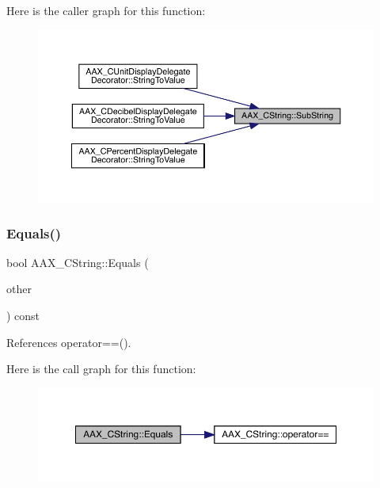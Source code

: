 Here is the caller graph for this function\+:
\nopagebreak
\begin{figure}[H]
\begin{center}
\leavevmode
\includegraphics[width=350pt]{a01573_a35132df5b9f73bc2ddbfd673f4a5d22a_icgraph}
\end{center}
\end{figure}
\mbox{\label{a01573_a842003a3cf6fb84be1f42160e87e0966}} 
\subsubsection{\texorpdfstring{Equals()}{Equals()}\hspace{0.1cm}{\footnotesize\ttfamily [1/3]}}
{\footnotesize\ttfamily bool A\+A\+X\+\_\+\+C\+String\+::\+Equals (\begin{DoxyParamCaption}\item[{const \mbox{\hyperlink{a01573}{A\+A\+X\+\_\+\+C\+String}} \&}]{other }\end{DoxyParamCaption}) const\hspace{0.3cm}{\ttfamily [inline]}}



References operator==().

Here is the call graph for this function\+:
\nopagebreak
\begin{figure}[H]
\begin{center}
\leavevmode
\includegraphics[width=350pt]{a01573_a842003a3cf6fb84be1f42160e87e0966_cgraph}
\end{center}
\end{figure}
\mbox{\label{a01573_ac076376f56af764540c48c015f0f541a}} 
